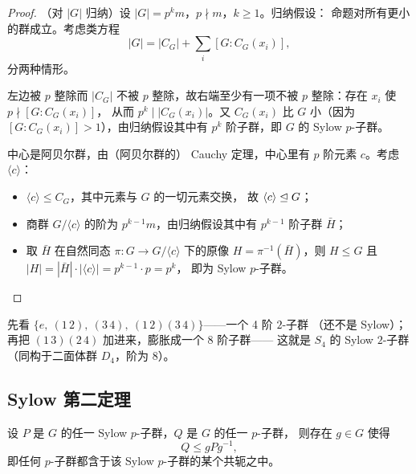 \begin{proof}
（对 $|G|$ 归纳）设 $|G| = p^k m$，$p\nmid m$，$k\ge 1$。归纳假设：
命题对所有更小的群成立。考虑类方程
\[
  |G| = |C_G| + \sum_i [G : C_G(x_i)],
\]
分两种情形。

左边被 $p$ 整除而 $|C_G|$ 不被 $p$
整除，故右端至少有一项不被 $p$ 整除：存在 $x_i$ 使 $p\nmid [G:C_G(x_i)]$，
从而 $p^k \mid |C_G(x_i)|$。又 $C_G(x_i)$ 比 $G$ 小（因为
$[G:C_G(x_i)]>1$），由归纳假设其中有 $p^k$ 阶子群，即 $G$ 的 Sylow
$p$-子群。

中心是阿贝尔群，由（阿贝尔群的）
Cauchy 定理，中心里有 $p$ 阶元素 $c$。考虑 $\langle c\rangle$：
\begin{itemize}[leftmargin=1.3em,itemsep=2pt]
  \item $\langle c\rangle\le C_G$，其中元素与 $G$ 的一切元素交换，
        故 $\langle c\rangle\trianglelefteq G$；
  \item 商群 $G/\langle c\rangle$ 的阶为 $p^{k-1}m$，由归纳假设其中有
        $p^{k-1}$ 阶子群 $\bar H$；
  \item 取 $\bar H$ 在自然同态 $\pi: G\to G/\langle c\rangle$ 下的原像
        $H=\pi^{-1}(\bar H)$，则 $H\le G$ 且
        $|H| = |\bar H|\cdot|\langle c\rangle| = p^{k-1}\cdot p = p^k$，
        即为 Sylow $p$-子群。
\end{itemize}
\end{proof}

\begin{remark}[回到 $S_4$]
先看 $\{e,\ (1\,2),\ (3\,4),\ (1\,2)(3\,4)\}$——一个 4 阶 $2$-子群
（还不是 Sylow）；再把 $(1\,3)(2\,4)$ 加进来，膨胀成一个 8 阶子群——
这就是 $S_4$ 的 Sylow $2$-子群（同构于二面体群 $D_4$，阶为 $8$）。
\end{remark}

\subsection{Sylow 第二定理}

\begin{theorem}
设 $P$ 是 $G$ 的任一 Sylow $p$-子群，$Q$ 是 $G$ 的任一 $p$-子群，
则存在 $g\in G$ 使得
\[
  Q \le gPg^{-1},
\]
即任何 $p$-子群都含于该 Sylow $p$-子群的某个共轭之中。
\end{theorem}

